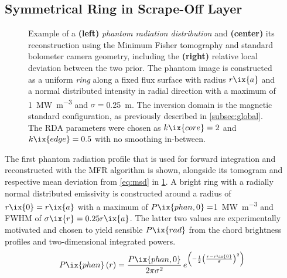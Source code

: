         \subsection{Symmetrical Ring in Scrape-Off Layer}\label{subsec:phantoms_symmring}%
%
            \begin{figure}[t]%
                \centering%
                \caption{Example of a \textbf{(left)} \textit{phantom radiation distribution} and \textbf{(center)} its reconstruction using the Minimum Fisher tomography and standard bolometer camera geometry, including the \textbf{(right)} relative local deviation between the two prior. The phantom image is constructed as a uniform \textit{ring} along a fixed flux surface with radius $r\ix{a}$ and a normal distributed intensity in radial direction with a maximum of \SI{1}{\mega\watt\per\cubic\meter} and $\sigma=$\SI{0.25}{\meter}. The inversion domain is the magnetic standard configuration, as previously described in \cref{subsec:global}. The RDA parameters were chosen as $k\ix{core}=2$ and $k\ix{edge}=0.5$ with no smoothing in-between.}\label{fig:phantom_fsring_example}%
            \end{figure}%
%
            The first phantom radiation profile that is used for forward integration and reconstructed with the MFR algorithm is shown, alongside its tomogram and respective mean deviation from \cref{eq:msd} in \cref{fig:phantom_fsring_example}. A bright ring with a radially normal distributed emissivity is constructed around a radius of $r\ix{0}=r\ix{a}$ with a maximum of $P\ix{phan,0}=$\SI{1}{\mega\watt\per\cubic\meter} and FWHM of $\sigma\ix{r}=0.25r\ix{a}$. The latter two values are experimentally motivated and chosen to yield sensible $P\ix{rad}$ from the chord brightness profiles and two-dimensional integrated powers.%
%
            \begin{align}%
                P\ix{phan}\left(r\right)=\frac{P\ix{phan,0}}{2\pi\sigma^{2}}\,e^{\left(-\frac{1}{2}\left(\frac{r-r\ix{0}}{\sigma}\right)^{2}\right)}\nonumber%
            \end{align}%
%
